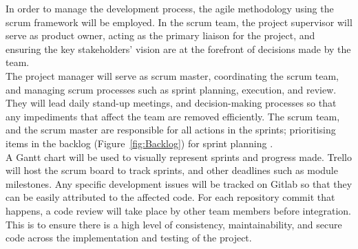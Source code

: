 
In order to manage the development process, the agile methodology using the scrum framework will be employed. In the scrum team, the project supervisor will serve as product owner, acting as the primary liaison for the project, and ensuring the key stakeholders' vision are at the forefront of decisions made by the team.\\

The project manager will serve as scrum master, coordinating the scrum team, and managing scrum processes such as sprint planning, execution, and review. They will lead daily stand-up meetings, and decision-making processes so that any impediments that affect the team are removed efficiently. The scrum team, and the scrum master are responsible for all actions in the sprints; prioritising items in the backlog (Figure~\ref{fig:Backlog}) for sprint planning \cite{scrumroles}.\\

A Gantt chart will be used to visually represent sprints and progress made. Trello will host the scrum board to track sprints, and other deadlines such as module milestones. Any specific development issues will be tracked on Gitlab so that they can be easily attributed to the affected code. For each repository commit that happens, a code review will take place by other team members before integration. This is to ensure there is a high level of consistency, maintainability, and secure code across the implementation and testing of the project. 